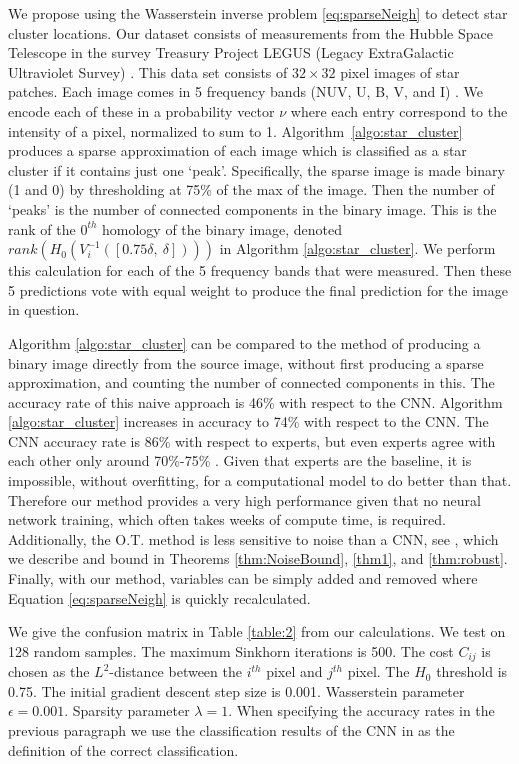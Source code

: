 \documentclass[conference]{IEEEtran}
\begin{document}
We propose using the Wasserstein inverse problem \eqref{eq:sparseNeigh} to detect star cluster locations. 
Our dataset consists of measurements from the Hubble Space Telescope in the survey Treasury Project LEGUS (Legacy ExtraGalactic Ultraviolet Survey) \cite{calzetti}. This data set consists of $32\times 32$ pixel images of star patches. Each image comes in 5 frequency bands (NUV, U, B, V, and I) \cite{calzetti}. We encode each of these in a probability vector $\nu$ where each entry correspond to the intensity of a pixel, normalized to sum to 1. Algorithm~\ref{algo:star_cluster} produces a sparse approximation of each image which is classified as a star cluster if it contains just one `peak'. Specifically, the sparse image is made binary (1 and 0) by thresholding at 75\% of the max of the image. Then the number of `peaks' is the number of connected components in the binary image. This is the rank of the $0^{th}$ homology of the binary image, denoted $rank(H_0(V_i^{-1}([0.75 \delta,\ \delta])))$ in Algorithm \ref{algo:star_cluster}. We perform this calculation for each of the 5 frequency bands that were measured. 
Then these 5 predictions vote with equal weight to produce the final prediction for the image in question. 

Algorithm \ref{algo:star_cluster} can be compared to the method of producing a binary image directly from the source image, without first producing a sparse approximation, and counting the number of connected components in this. The accuracy rate of this naive approach is 46\% with respect to the CNN. Algorithm \ref{algo:star_cluster} increases in accuracy to 74\% with respect to the CNN. The CNN accuracy rate is 86\% with respect to experts, but even experts agree with each other only around 70\%-75\% \cite{adamo, grasha, wei}. Given that experts are the baseline, it is impossible, without overfitting, for a computational model to do better than that. Therefore our method provides a very high performance given that no neural network training, which often takes weeks of compute time, is required. Additionally, the O.T. method is less sensitive to noise than a CNN, see \cite{zou}, which we describe and bound in Theorems \ref{thm:NoiseBound}, \ref{thm1}, and \ref{thm:robust}. Finally, with our method, variables can be simply added and removed where Equation \eqref{eq:sparseNeigh} is quickly recalculated. 

We give the confusion matrix in Table \ref{table:2} from our calculations. We test on 128 random samples. The maximum Sinkhorn iterations is 500. The cost $C_{ij}$ is chosen as the $L^2$-distance between the $i^{th}$ pixel and $j^{th}$ pixel. The $H_0$ threshold is 0.75. The initial gradient descent step size is 0.001. Wasserstein parameter $\epsilon=0.001$. Sparsity parameter $\lambda=1$. When specifying the accuracy rates in the previous paragraph we use the classification results of the CNN in \cite{perez} as the definition of the correct classification. 
\end{document}
